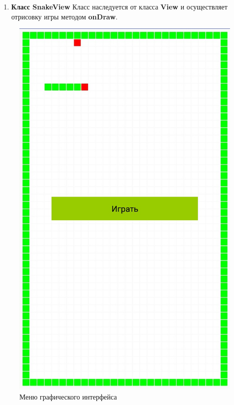 	\begin{enumerate}
		\item \textbf{Класс SnakeView}
		Класс наследуется от класса \textbf{View} и осуществляет отрисовку игры методом \textbf{onDraw}.
	\end{enumerate}
	
	\begin{figure}[H]
		\begin{minipage}[h]{0.33\linewidth}
			\includegraphics[width=1\textwidth]{../image/menu.png}
			\caption{Меню графического интерфейса}
			\label{pic:android_menu}

\end{minipage}
\end{figure}
